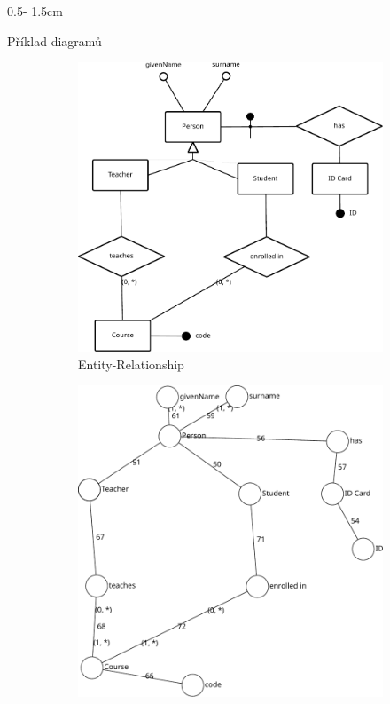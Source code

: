 \documentclass[a0paper]{uioposter}
\begin{document}
\begin{frame}
\begin{columns}[onlytextwidth]
\begin{column}{0.5\textwidth - 1.5cm}
      \begin{block}{Příklad diagramů}
        \begin{figure}
          \centering
          \begin{subfigure}{0.45\textwidth}
            \includegraphics[width=1\textwidth]{./images/university-er.pdf}
            \caption{Entity-Relationship}
          \end{subfigure}
          \begin{subfigure}{0.45\textwidth}
            \includegraphics[width=\textwidth]{./images/university-schemcat.pdf}

\end{subfigure}
\end{figure}
\end{block}
\end{column}
\end{columns}
\end{frame}
\end{document}
